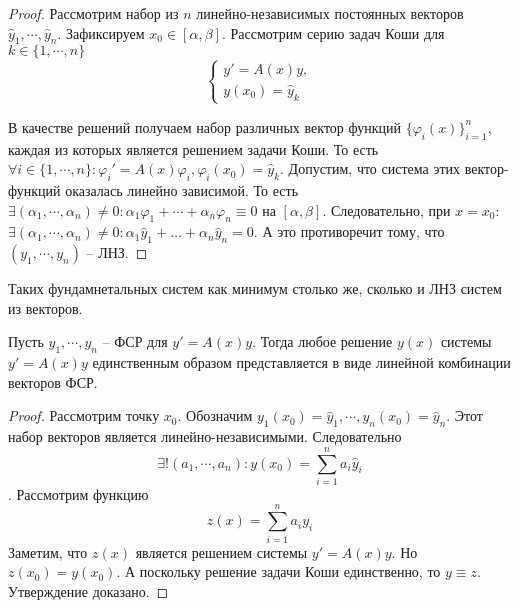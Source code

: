 \documentclass[document.tex]{subfiles}
\begin{document}
\begin{proof}
    Рассмотрим набор из $n$ линейно-независимых постоянных векторов $\hat y_1, \cdots, \hat y_n$. Зафиксируем $x_0 \in
    [\alpha, \beta]$. Рассмотрим серию задач Коши для $k \in \{1, \cdots, n\}$
    \[
        \begin{cases}
            y' = A(x)y, \\
            y(x_0) = \hat y_k
        \end{cases}
    \]

    В качестве решений получаем набор различных вектор функций $\{\varphi_i(x)\}_{i = 1}^n$, каждая из которых является
    решением задачи Коши. То есть $\forall i \in \{1, \cdots, n\}: \varphi_i' = A(x) \varphi_i, \varphi_i(x_0) = \hat
    y_k$. Допустим, что система этих вектор-функций оказалась линейно зависимой. То есть $\exists (\alpha_1, \cdots,
    \alpha_n) \neq 0: \alpha_1 \varphi_1 + \cdots + \alpha_n \varphi_n \equiv 0$ на $[\alpha, \beta]$. Следовательно,
    при $x = x_0$: $\exists (\alpha_1, \cdots, \alpha_n) \neq 0: \alpha_1 \hat y_1 + \ldots + \alpha_n \hat y_n = 0$. А
    это противоречит тому, что $(y_1, \cdots, y_n)$ -- ЛНЗ.
\end{proof}
\begin{remark}
    Таких фундамнетальных систем как минимум столько же, сколько и ЛНЗ систем из векторов.
\end{remark}

\begin{theorem}
    Пусть $y_1, \cdots, y_n$ -- ФСР для $y' = A(x)y$. Тогда любое решение $y(x)$ системы $y' = A(x)y$ единственным
    образом представляется в виде линейной комбинации векторов ФСР.
\end{theorem}

\begin{proof}
    Рассмотрим точку $x_0$. Обозначим $y_1(x_0) = \hat y_1, \cdots, y_n(x_0) = \hat y_n$. Этот набор векторов является
    линейно-независимыми. Следовательно
    \[
        \exists ! (a_1, \cdots, a_n): y(x_0) = \sum_{i = 1}^n a_i \hat y_i
    \]
    . Рассмотрим функцию
    \[
        z(x) = \sum_{i = 1}^n a_i y_i
    \]
    Заметим, что $z(x)$ является решением системы $y' = A(x)y$. Но $z(x_0) = y(x_0)$. А поскольку решение задачи Коши
    единственно, то $y \equiv z$. Утверждение доказано.
\end{proof}
\end{document}
